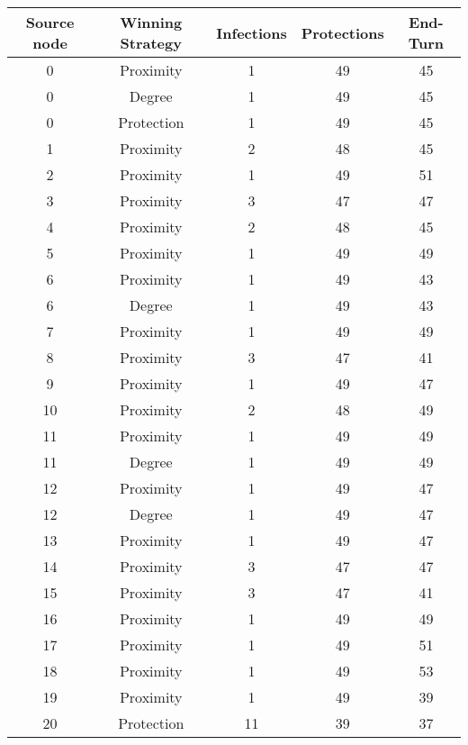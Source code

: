 \documentclass[results.tex]{subfiles}
\begin{document}
\begin{center}
  \begin{tabular}{| c || c | c | c | c |}
    \hline
    {\bfseries Source node} & {\bfseries Winning Strategy} & {\bfseries Infections} & {\bfseries Protections} & {\bfseries End-Turn} \\  %
    \hline\hline
    0 & Proximity & 1 & 49 & 45 \\ 
    \hline
    0 & Degree & 1 & 49 & 45 \\ 
    \hline
    0 & Protection & 1 & 49 & 45 \\ 
    \hline
    1 & Proximity & 2 & 48 & 45 \\ 
    \hline
    2 & Proximity & 1 & 49 & 51 \\ 
    \hline
    3 & Proximity & 3 & 47 & 47 \\ 
    \hline
    4 & Proximity & 2 & 48 & 45 \\ 
    \hline
    5 & Proximity & 1 & 49 & 49 \\ 
    \hline
    6 & Proximity & 1 & 49 & 43 \\ 
    \hline
    6 & Degree & 1 & 49 & 43 \\ 
    \hline
    7 & Proximity & 1 & 49 & 49 \\ 
    \hline
    8 & Proximity & 3 & 47 & 41 \\ 
    \hline
    9 & Proximity & 1 & 49 & 47 \\ 
    \hline
    10 & Proximity & 2 & 48 & 49 \\ 
    \hline
    11 & Proximity & 1 & 49 & 49 \\ 
    \hline
    11 & Degree & 1 & 49 & 49 \\ 
    \hline
    12 & Proximity & 1 & 49 & 47 \\ 
    \hline
    12 & Degree & 1 & 49 & 47 \\ 
    \hline
    13 & Proximity & 1 & 49 & 47 \\ 
    \hline
    14 & Proximity & 3 & 47 & 47 \\ 
    \hline
    15 & Proximity & 3 & 47 & 41 \\ 
    \hline
    16 & Proximity & 1 & 49 & 49 \\ 
    \hline
    17 & Proximity & 1 & 49 & 51 \\ 
    \hline
    18 & Proximity & 1 & 49 & 53 \\ 
    \hline
    19 & Proximity & 1 & 49 & 39 \\ 
    \hline
    20 & Protection & 11 & 39 & 37 \\ 

\end{tabular}
\end{center}
\end{document}
